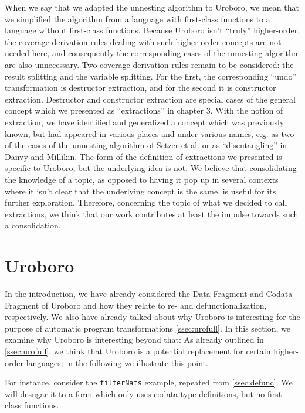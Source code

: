When we say that we adapted the unnesting algorithm to Uroboro, we mean that we simplified the algorithm from a language with first-class functions to a language without first-class functions. Because Uroboro isn't ``truly'' higher-order, the coverage derivation rules dealing with such higher-order concepts are not needed here, and consequently the corresponding cases of the unnesting algorithm are also unnecessary. Two coverage derivation rules remain to be considered: the result splitting and the variable splitting. For the first, the corresponding ``undo'' transformation is destructor extraction, and for the second it is constructor extraction. Destructor and constructor extraction are special cases of the general concept which we presented as ``extractions'' in chapter 3. With the notion of extraction, we have identified and generalized a concept which was previously known, but had appeared in various places and under various names, e.g. as two of the cases of the unnesting algorithm of Setzer et al.\cite{setzer14unnesting} or as ``disentangling'' in Danvy and Millikin\cite{danvy09refunctionalization}. The form of the definition of extractions we presented is specific to Uroboro, but the underlying idea is not. We believe that consolidating the knowledge of a topic, as opposed to having it pop up in several contexts where it isn't clear that the underlying concept is the same, is useful for its further exploration. Therefore, concerning the topic of what we decided to call extractions, we think that our work contributes at least the impulse towards such a consolidation.

\section{Uroboro}
\label{sec:reluro}

In the introduction, we have already considered the Data Fragment and Codata Fragment of Uroboro and how they relate to re- and defunctionalization, respectively. We also have already talked about why Uroboro is interesting for the purpose of automatic program transformations \autoref{ssec:urofull}. In this section, we examine why Uroboro is interesting beyond that: As already outlined in \autoref{ssec:urofull}, we think that Uroboro is a potential replacement for certain higher-order languages; in the following we illustrate this point.

For instance, consider the \texttt{filterNats} example, repeated from \autoref{ssec:defunc}. We will desugar it to a form which only uses codata type definitions, but no first-class functions.

